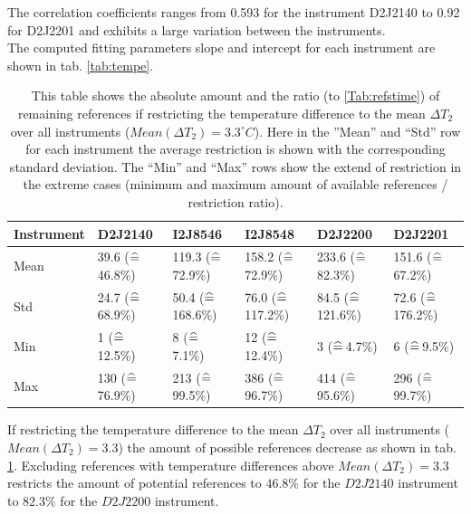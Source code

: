 The correlation coefficients ranges from 0.593 for the instrument D2J2140 to  0.92 for D2J2201 and exhibits a large variation between the instruments. \\
The computed fitting parameters slope and intercept for each instrument are shown in tab. \ref{tab:tempe}.\\
\begin{table}
	\centering
	\begin{tabular}{|p{1.8cm}|p{2.15cm}|p{2.15cm}|p{2.15cm}|p{2.15cm}|p{2.15cm}|}
		Instrument	&D2J2140&I2J8546& I2J8548&D2J2200&D2J2201\\
		\toprule
		Mean&
		39.6 ($\mathrel{\widehat{=}}\,$46.8\%)&
		119.3 ($\mathrel{\widehat{=}}\,$72.9\%)
		&158.2 ($\mathrel{\widehat{=}}\,$72.9\%)
		&233.6 ($\mathrel{\widehat{=}}\,$82.3\%)
		&151.6 ($\mathrel{\widehat{=}}\,$67.2\%)\\
		\midrule
		Std&
		24.7 ($\mathrel{\widehat{=}}\,$68.9\%)&
		50.4 ($\mathrel{\widehat{=}}\,$168.6\%)&
		76.0 ($\mathrel{\widehat{=}}\,$117.2\%)&
		84.5 ($\mathrel{\widehat{=}}\,$121.6\%)&
		72.6 ($\mathrel{\widehat{=}}\,$176.2\%)\\
		\midrule
		Min&
		1 ($\mathrel{\widehat{=}}\,$12.5\%)
		&8 ($\mathrel{\widehat{=}}\,$7.1\%)&
		12 ($\mathrel{\widehat{=}}\,$12.4\%)&
		3 ($\mathrel{\widehat{=}}\,$4.7\%) &
		6 ($\mathrel{\widehat{=}}\,$9.5\%)\\
		\midrule
		Max
		&
		130	 ($\mathrel{\widehat{=}}\,$76.9\%)&
		213	 ($\mathrel{\widehat{=}}\,$99.5\%)&
		386 ($\mathrel{\widehat{=}}\,$96.7\%)&
		414	 ($\mathrel{\widehat{=}}\,$95.6\%) &
		296	 ($\mathrel{\widehat{=}}\,$99.7\%)\\
		\bottomrule
	\end{tabular}
	\caption{This table shows the absolute amount and the ratio (to \cref{Tab:refstime}) of remaining references if restricting the temperature difference to the mean $\Delta T_{2}$ over all instruments ($Mean(\Delta T_{2}) = 3.3^{\circ}C$). Here in the ”Mean” and “Std” row for each  instrument the average restriction is shown with the corresponding standard deviation. The “Min” and “Max” rows show the extend of restriction in the extreme cases (minimum and maximum amount of available references / restriction ratio).}
	\label{tab:decTemp}
\end{table}	
If restricting the temperature difference to the mean $\Delta T_{2}$ over all instruments ($Mean(\Delta T_{2}) = 3.3$) the amount of possible references decrease as shown in tab. \ref{tab:decTemp}. Excluding references with temperature differences above $Mean(\Delta T_{2}) = 3.3$ restricts the amount of potential references to $46.8\%$ for the $D2J2140$ instrument to $82.3\%$ for the $D2J2200$ instrument.

